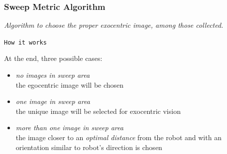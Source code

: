\frame
{
  \frametitle{Sweep Metric Algorithm}
  
  \emph{Algorithm to choose the proper \textit{exocentric} image,
    among those collected.}

  \begin{block} {\alert{\texttt{How it works}}}
 
    At the end, three possible cases:
    \pause
    \begin{itemize}
      
    \item \alert{\textit{no images in \textit{sweep area}}} \\
      the egocentric image will be chosen
      \pause
      
    \item \alert{\textit{one image in \textit{sweep area}}} \\
      the unique image will be selected for exocentric vision
      \pause
      
    \item \alert{\textit{more than one image in \textit{sweep area}}} \\
      the image closer to an \textit{optimal distance} from the robot
      and with an orientation similar to robot's direction is chosen

      
    \end{itemize}
    
  \end{block}
}




